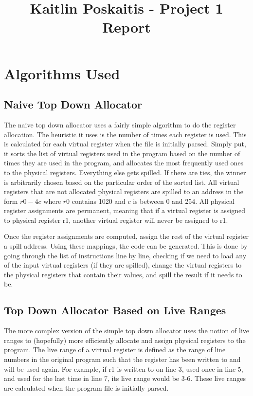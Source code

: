 \documentclass[12pt]{article}
\title{\bf Kaitlin Poskaitis - Project 1 Report}
\author{}
\date{}
\begin{document}
\maketitle

\section*{Algorithms Used}

    \subsection{Naive Top Down Allocator}
    The naive top down allocator uses a fairly simple algorithm to do the
    register allocation. The heuristic it uses is the number of times each
    register is used. This is calculated for each virtual register when the file
    is initially parsed. Simply put, it sorts the list of virtual registers used
    in the program based on the number of times they are used in the program,
    and allocates the most frequently used ones to the physical registers.
    Everything else gets spilled. If there are ties, the winner is arbitrarily
    chosen based on the particular order of the sorted list. All virtual
    registers that are not allocated physical registers are spilled to an
    address in the form $r0 - 4c$ where $r0$ contains 1020 and $c$ is between 0
    and 254. All physical register assignments are permanent, meaning that
    if a virtual register is assigned to physical register r1, another virtual
    register will never be assigned to r1.

    Once the register assignments are computed, assign the rest of the virtual
    register a spill address. Using these mappings, the code can be generated.
    This is done by going through the list of instructions line by line,
    checking if we need to load any of the input virtual registers (if they are
    spilled), change the virtual registers to the physical registers that
    contain their values, and spill the result if it needs to be.

    \subsection{Top Down Allocator Based on Live Ranges}
    The more complex version of the simple top down allocator uses the notion of
    live ranges to (hopefully) more efficiently allocate and assign physical
    registers to the program. The live range of a virtual register is defined as
    the range of line numbers in the original program such that the register has
    been written to and will be used again. For example, if r1 is written to on
    line 3, used once in line 5, and used for the last time in line 7, its live
    range would be 3-6. These live ranges are calculated when the program file
    is initially parsed.
\end{document}
